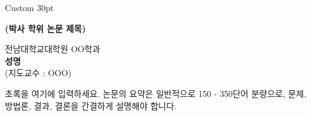 {\fontsize{30pt}{36pt}\selectfont Custom 30pt}

\newpage	
\cleardoublepage
{}
{}
\vspace*{0cm}
\begin{center}
{\LARGE\bfseries (박사 학위 논문 제목) \par}    
{\large	전남대학교대학원 OO학과}\\[1\baselineskip]
{\Large {\bfseries 성명 }\\[1\baselineskip] (지도교수 : OOO)}\\[3\baselineskip]
\end{center}

{\Large {}\par}
초록을 여기에 입력하세요. 논문의 요약은 일반적으로 150 - 350단어 분량으로, 문제, 방법론, 결과, 결론을 간결하게 설명해야 합니다.